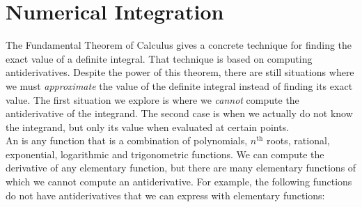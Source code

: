 \section{Numerical Integration}{}{}\label{sec:numerical_integration}

The Fundamental Theorem of Calculus gives a concrete technique for finding the exact value of a definite integral. That technique is based on computing antiderivatives. Despite the power of this theorem, there are still situations where we must \textit{approximate} the value of the definite integral instead of finding its exact value. The first situation we explore is where we \textit{cannot} compute the antiderivative of the integrand. The second case is when we actually do not know the integrand, but only its value when evaluated at certain points.\\ %


%
An  is any function that is a combination of polynomials, $n^{\text{th}}$ roots, rational, exponential, logarithmic and trigonometric functions. We can compute the derivative of any elementary function, but there are many elementary functions of which we cannot compute an antiderivative. For example, the following functions do not have antiderivatives that we can express with elementary functions:

